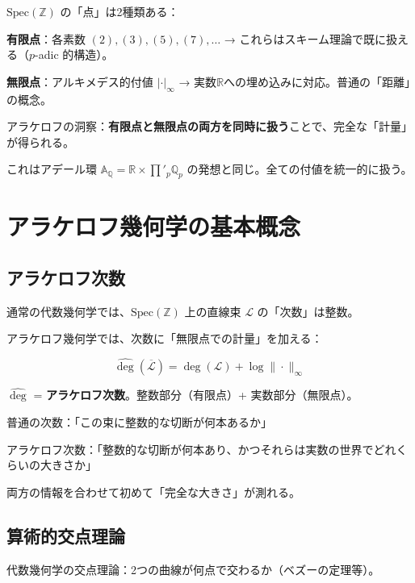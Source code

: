 \documentclass[12pt,a4paper]{article}
\newcommand{\Spec}{\mathrm{Spec}}
\begin{document}
\begin{mathbox}[核心的アイデア]
$\Spec(\mathbb{Z})$ の「点」は2種類ある：

\textbf{有限点}：各素数 $(2), (3), (5), (7), \ldots$
→ これらはスキーム理論で既に扱える（$p$-adic 的構造）。

\textbf{無限点}：アルキメデス的付値 $|\cdot|_\infty$
→ 実数$\mathbb{R}$への埋め込みに対応。普通の「距離」の概念。

アラケロフの洞察：\textbf{有限点と無限点の両方を同時に扱う}ことで、完全な「計量」が得られる。

これはアデール環 $\mathbb{A}_\mathbb{Q} = \mathbb{R} \times \prod'_p \mathbb{Q}_p$ の発想と同じ。全ての付値を統一的に扱う。
\end{mathbox}

\section{アラケロフ幾何学の基本概念}

\subsection{アラケロフ次数}

通常の代数幾何学では、$\Spec(\mathbb{Z})$ 上の直線束 $\mathcal{L}$ の「次数」は整数。

アラケロフ幾何学では、次数に「無限点での計量」を加える：

$$\widehat{\deg}(\overline{\mathcal{L}}) = \deg(\mathcal{L}) + \log\|\cdot\|_\infty$$

$\widehat{\deg}$ = \textbf{アラケロフ次数}。整数部分（有限点）+ 実数部分（無限点）。

\begin{storybox}[直感的意味]
普通の次数：「この束に整数的な切断が何本あるか」

アラケロフ次数：「整数的な切断が何本あり、かつそれらは実数の世界でどれくらいの大きさか」

両方の情報を合わせて初めて「完全な大きさ」が測れる。
\end{storybox}

\subsection{算術的交点理論}

代数幾何学の交点理論：2つの曲線が何点で交わるか（ベズーの定理等）。
\end{document}
